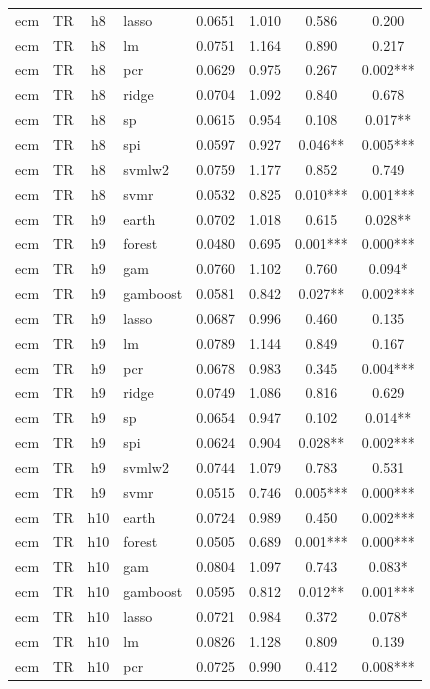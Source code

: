 \begin{ThreePartTable}
\begin{longtable}[t]{llclcccc}
ecm & TR & h8 & lasso & 0.0651 & 1.010 & 0.586 & 0.200\\
ecm & TR & h8 & lm & 0.0751 & 1.164 & 0.890 & 0.217\\
ecm & TR & h8 & pcr & 0.0629 & 0.975 & 0.267 & 0.002***\\
ecm & TR & h8 & ridge & 0.0704 & 1.092 & 0.840 & 0.678\\
ecm & TR & h8 & sp & 0.0615 & 0.954 & 0.108 & 0.017**\\
ecm & TR & h8 & spi & 0.0597 & 0.927 & 0.046** & 0.005***\\
ecm & TR & h8 & svmlw2 & 0.0759 & 1.177 & 0.852 & 0.749\\
ecm & TR & h8 & svmr & 0.0532 & 0.825 & 0.010*** & 0.001***\\
\addlinespace
ecm & TR & h9 & earth & 0.0702 & 1.018 & 0.615 & 0.028**\\
ecm & TR & h9 & forest & 0.0480 & 0.695 & 0.001*** & 0.000***\\
ecm & TR & h9 & gam & 0.0760 & 1.102 & 0.760 & 0.094*\\
ecm & TR & h9 & gamboost & 0.0581 & 0.842 & 0.027** & 0.002***\\
ecm & TR & h9 & lasso & 0.0687 & 0.996 & 0.460 & 0.135\\
ecm & TR & h9 & lm & 0.0789 & 1.144 & 0.849 & 0.167\\
ecm & TR & h9 & pcr & 0.0678 & 0.983 & 0.345 & 0.004***\\
ecm & TR & h9 & ridge & 0.0749 & 1.086 & 0.816 & 0.629\\
ecm & TR & h9 & sp & 0.0654 & 0.947 & 0.102 & 0.014**\\
ecm & TR & h9 & spi & 0.0624 & 0.904 & 0.028** & 0.002***\\
ecm & TR & h9 & svmlw2 & 0.0744 & 1.079 & 0.783 & 0.531\\
ecm & TR & h9 & svmr & 0.0515 & 0.746 & 0.005*** & 0.000***\\
\addlinespace
ecm & TR & h10 & earth & 0.0724 & 0.989 & 0.450 & 0.002***\\
ecm & TR & h10 & forest & 0.0505 & 0.689 & 0.001*** & 0.000***\\
ecm & TR & h10 & gam & 0.0804 & 1.097 & 0.743 & 0.083*\\
ecm & TR & h10 & gamboost & 0.0595 & 0.812 & 0.012** & 0.001***\\
ecm & TR & h10 & lasso & 0.0721 & 0.984 & 0.372 & 0.078*\\
ecm & TR & h10 & lm & 0.0826 & 1.128 & 0.809 & 0.139\\
ecm & TR & h10 & pcr & 0.0725 & 0.990 & 0.412 & 0.008***\\

\end{longtable}
\end{ThreePartTable}
